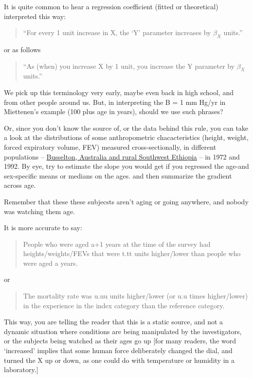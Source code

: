 \documentclass[]{book}
\begin{document}
It is quite common to hear a regression coefficient (fitted or theoretical) interpreted this way:

\begin{quote}
``For every 1 unit increase in X, the `Y' parameter increases by \(\beta_X\) units.''
\end{quote}

or as follows

\begin{quote}
``As (when) you increase X by 1 unit, you increase the Y parameter by \(\beta_X\) units.''
\end{quote}

We pick up this terminology very early, maybe even back in high school, and from other people around us. But, in interpreting the B = 1 mm Hg/yr in Miettenen's example (100 plus age in years), should we use such phrases?

Or, since you don't know the source of, or the data behind this rule, you can take a look at the distributions of some anthropometric chacacteristics (height, weight, forced expiratory volume, FEV) measured cross-sectionally, in different populations -- \href{http://www.biostat.mcgill.ca/hanley/c678/index.html\#anthropometricData}{Busselton, Australia and rural Southwest Ethiopia} -- in 1972 and 1992. By eye, try to estimate the slope you would get if you regressed the age-and sex-specific means or medians
on the ages. and then summarize the gradient across age.

Remember that these these subjecsts aren't aging or going anywhere, and nobody was watching them age.

It is more accurate to say:

\begin{quote}
People who were aged a+1 years at the time of the survey had heights/weights/FEVs that were t.tt units higher/lower than people who were aged a years.
\end{quote}

or

\begin{quote}
The mortality rate was u.uu units higher/lower (or u.u times higher/lower) in the experience in the index category than the reference category.
\end{quote}

This way, you are telling the reader that this is a static source, and not a dynamic situation where conditions are being manipulated by the investigators, or the subjects being watched as their ages go up {[}for many readers, the word `increased' implies that some human force deliberately changed the dial, and turned the X up or down, as one could do with temperature or humidity in a laboratory.{]}
\end{document}
